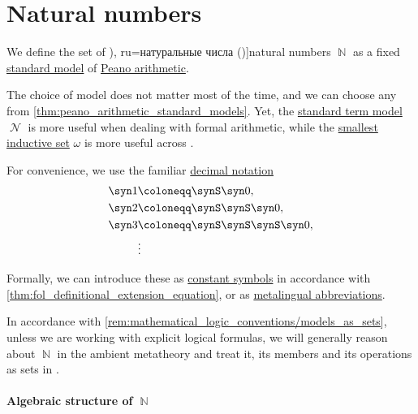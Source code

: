 \section{Natural numbers}\label{sec:natural_numbers}

\begin{definition}\label{def:natural_numbers}
  We define the set of \term[bg=естествени числа (\cite[371]{ГеновМиховскиМоллов1991Алгебра}), ru=натуральные числа (\cite[def. 11.1]{Проскуряков1951ТеоретическиеОсновыАрифметики})]{natural numbers} \( \BbbN \) as a fixed \hyperref[def:peano_arithmetic_standard_model]{standard model} of \hyperref[def:peano_arithmetic]{Peano arithmetic}.

  The choice of model does not matter most of the time, and we can choose any from \cref{thm:peano_arithmetic_standard_models}. Yet, the \hyperref[def:peano_arithmetic_term_model]{standard term model} \( \mscrN \) is more useful when dealing with formal arithmetic, while the \hyperref[def:smallest_inductive_set]{smallest inductive set} \( \omega \) is more useful across .

  For convenience, we use the familiar \hyperref[def:positional_number_system/decimal]{decimal notation}
  \begin{align*}
    \syn1 &\coloneqq \synS \syn0,             \\
    \syn2 &\coloneqq \synS \synS \syn0,       \\
    \syn3 &\coloneqq \synS \synS \synS \syn0, \\
          &\vdots                             \\
  \end{align*}

  Formally, we can introduce these as \hyperref[def:fol_signature/function]{constant symbols} in accordance with \cref{thm:fol_definitional_extension_equation}, or as \hyperref[con:syntactic_abbreviation]{metalingual abbreviations}.
\end{definition}
\begin{comments}
  \item In accordance with \cref{rem:mathematical_logic_conventions/models_as_sets}, unless we are working with explicit logical formulas, we will generally reason about \( \BbbN \) in the ambient metatheory and treat it, its members and its operations as sets in \hyperref[def:axiom_of_universes]{}.
\end{comments}

\paragraph{Algebraic structure of \( \BbbN \)}

